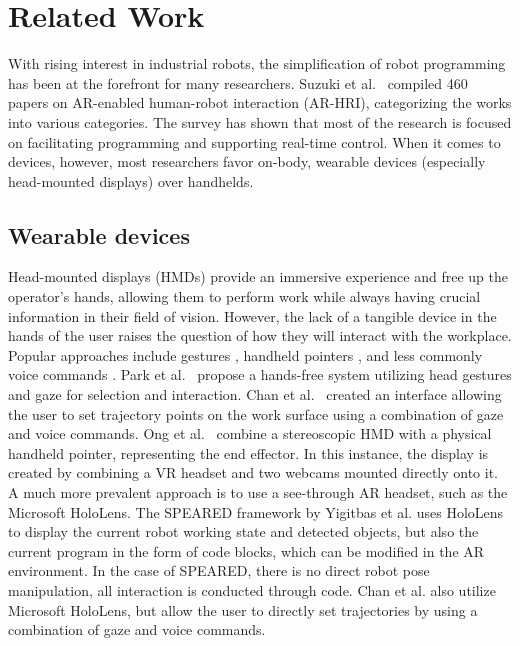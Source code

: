 \chapter{Related Work}
With rising interest in industrial robots, the simplification of robot programming has been at the forefront for many researchers. Suzuki et al.~\cite{suzuki2022augmented} compiled 460 papers on AR-enabled human-robot interaction (AR-HRI), categorizing the works into various categories. The survey has shown that most of the research is focused on facilitating programming and supporting real-time control. When it comes to devices, however, most researchers favor on-body, wearable devices (especially head-mounted displays) over handhelds. 

\section{Wearable devices}
Head-mounted displays (HMDs) provide an immersive experience and free up the operator's hands, allowing them to perform work while always having crucial information in their field of vision. However, the lack of a tangible device in the hands of the user raises the question of how they will interact with the workplace. Popular approaches include gestures \cite{voicelargescale, handsfree, packing}, handheld pointers \cite{2009, speared}, and less commonly voice commands \cite{voicelargescale}. Park et al.~\cite{handsfree} propose a hands-free system utilizing head gestures and gaze for selection and interaction. Chan et al.~\cite{voicelargescale} created an interface allowing the user to set trajectory points on the work surface using a combination of gaze and voice commands. Ong et al.~\cite{ONG2020101820} combine a stereoscopic HMD with a physical handheld pointer, representing the end effector. In this instance, the display is created by combining a VR headset and two webcams mounted directly onto it. A much more prevalent approach is to use a see-through AR headset, such as the Microsoft HoloLens. The SPEARED framework by Yigitbas et al.\cite{speared} uses HoloLens to display the current robot working state and detected objects, but also the current program in the form of code blocks, which can be modified in the AR environment. In the case of SPEARED, there is no direct robot pose manipulation, all interaction is conducted through code. Chan et al.\cite{voicelargescale} also utilize Microsoft HoloLens, but allow the user to directly set trajectories by using a combination of gaze and voice commands. 


